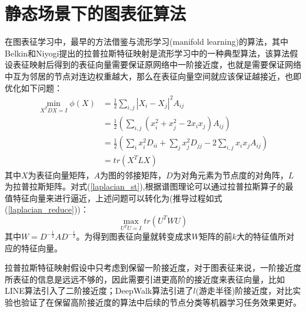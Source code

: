 \section{静态场景下的图表征算法}
在图表征学习中，最早的方法借鉴与流形学习(manifold learning)的算法，其中Belkin和Niyogi提出的拉普拉斯特征映射是流形学习中的一种典型算法，该算法假设表征映射后得到的表征向量需要保证原网络中一阶接近度，也就是需要保证网络中互为邻居的节点对连边权重越大，那么在表征向量空间就应该保证越接近，也即优化如下问题：
\begin{equation}\label{laplacian_st}
\begin{aligned}
\min_{X^TDX=I} \phi(X) &= \frac{1}{2}\sum_{i,j}|X_i - X_j|^2A_{ij} \\
&= \frac{1}{2}(\sum_{i,j}(x_i^2+x_j^2-2x_ix_j) A_{ij}) \\
&=\frac{1}{2} (\sum_ix_i^2D_{ii} +\sum_j x_j^2 D_{jj} - 2\sum_{i,j}x_i x_j A_{ij}) \\
&= tr(X^TLX)
\end{aligned}
\end{equation}
其中$X$为表征向量矩阵，$A$为图的邻接矩阵，$D$为对角元素为节点度的对角阵，$L$为拉普拉斯矩阵。对式(\ref{laplacian_st}),根据谱图理论\cite{chung1997spectral}可以通过拉普拉斯算子的最值特征向量来进行逼近，上述问题可以转化为(推导过程如式(\ref{laplacian_reduce}))：
\begin{equation}
\max_{U^TU = I} tr(U^TWU)
\end{equation}
其中$W = D^{-\frac{1}{2}}AD^{-\frac{1}{2}} $。为得到图表征向量就转变成求$W$矩阵的前$k$大的特征值所对应的特征向量。

拉普拉斯特征映射假设中只考虑到保留一阶接近度，对于图表征来说，一阶接近度所表征的信息是远远不够的，因此需要引进更高阶的接近度来表征向量，比如LINE算法引入了二阶接近度；DeepWalk算法引进了$l$(游走半径)阶接近度，对比实验也验证了在保留高阶接近度的算法中后续的节点分类等机器学习任务效果更好。

